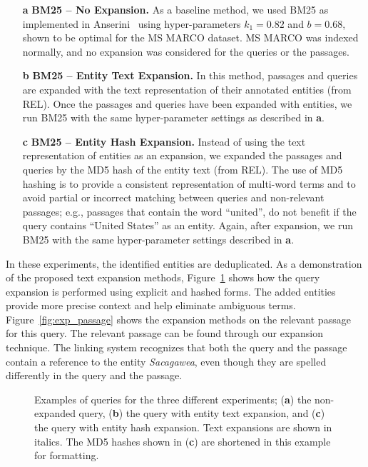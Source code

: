 \begin{itemize}
	\item[\textbf{a}] \textbf{BM25 -- No Expansion.} As a baseline method, we used BM25 as implemented in Anserini~\cite{Kamphuis2020BM25} using hyper-parameters $k_1=0.82$ and $b=0.68$, shown to be optimal for the MS MARCO dataset. MS MARCO was indexed normally, and no expansion was considered for the queries or the passages. 
	\item[\textbf{b}] \textbf{BM25 -- Entity Text Expansion.} In this method, passages and queries are expanded with the text representation of their annotated entities (from REL). Once the passages and queries have been expanded with entities, we run BM25 with the same hyper-parameter settings as described in \textbf{a}.
	\item[\textbf{c}] \textbf{BM25 -- Entity Hash Expansion.} Instead of using the text representation of entities as an expansion, we expanded the passages and queries by the MD5 hash of the entity text (from REL). The use of MD5 hashing is to provide a consistent representation of multi-word terms and to avoid partial or incorrect matching between queries and non-relevant passages; e.g., passages that contain the word ``united'', do not benefit if the query contains ``United States'' as an entity. Again, after expansion, we run BM25 with the same hyper-parameter settings described in \textbf{a}.
\end{itemize}
In these experiments, the identified entities are deduplicated. As a demonstration of the proposed text expansion methods, Figure~\ref{fig:exp_queries} shows how the query expansion is performed using explicit and hashed forms. The added entities provide more precise context and help eliminate ambiguous terms. Figure~\ref{fig:exp_passage} shows the expansion methods on the relevant passage for this query. The relevant passage can be found through our expansion technique. The linking system recognizes that both the query and the passage contain a reference to the entity \emph{Sacagawea}, even though they are spelled differently in the query and the passage.

\begin{figure}
	\caption{Examples of queries for the three different experiments; (\textbf{a}) the non-expanded query, (\textbf{b}) the query with entity text expansion, and (\textbf{c}) the query with entity hash expansion. Text expansions are shown in italics. The MD5 hashes shown in (\textbf{c}) are shortened in this example for formatting.}
	\label{fig:exp_queries}
\end{figure}

